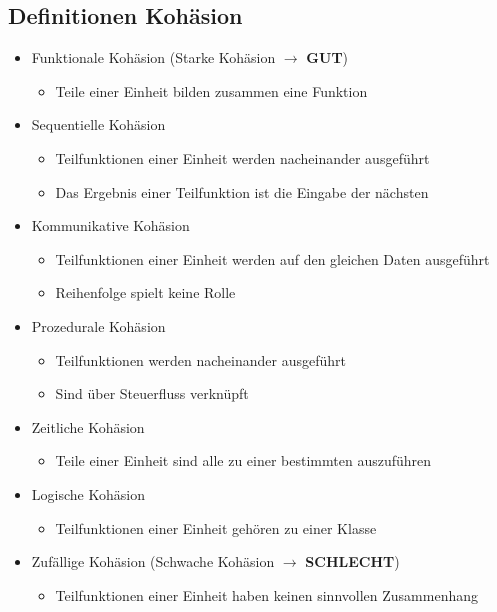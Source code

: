 \subsection{Definitionen Kohäsion}
\begin{itemize}
  \item Funktionale Kohäsion (Starke Kohäsion $\rightarrow$ \textbf{GUT})
  \begin{itemize}
    \item Teile einer Einheit bilden zusammen eine Funktion 
  \end{itemize}
  \item Sequentielle Kohäsion
   \begin{itemize}
    \item Teilfunktionen einer Einheit werden nacheinander ausgeführt
    \item Das Ergebnis einer Teilfunktion ist die Eingabe der nächsten
  \end{itemize}
  \item Kommunikative Kohäsion
  \begin{itemize}
    \item Teilfunktionen einer Einheit werden auf den gleichen Daten ausgeführt
    \item Reihenfolge spielt keine Rolle
  \end{itemize}
  \item Prozedurale Kohäsion
  \begin{itemize}
    \item Teilfunktionen werden nacheinander ausgeführt
    \item Sind über Steuerfluss verknüpft
  \end{itemize}
  \item Zeitliche Kohäsion
  \begin{itemize}
    \item Teile einer Einheit sind alle zu einer bestimmten auszuführen
  \end{itemize}
  \item Logische Kohäsion
  \begin{itemize}
    \item Teilfunktionen einer Einheit gehören zu einer Klasse
  \end{itemize}
  \item Zufällige Kohäsion (Schwache Kohäsion $\rightarrow$ \textbf{SCHLECHT})
  \begin{itemize}
    \item Teilfunktionen einer Einheit haben keinen sinnvollen Zusammenhang
  \end{itemize}
\end{itemize}
